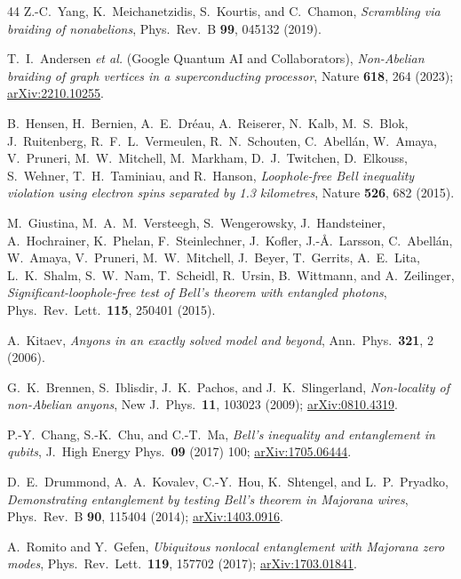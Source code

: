 \documentclass[aps,pra,twocolumn,superscriptaddress,longbibliography,floatfix,nofootinbib]{revtex4-2}
\begin{document}
\begin{thebibliography}{44}
Z.-C.~Yang, K.~Meichanetzidis, S.~Kourtis, and C.~Chamon,
\emph{Scrambling via braiding of nonabelions},
Phys.\ Rev.\ B \textbf{99}, 045132 (2019).

T.~I.~Andersen \emph{et al.} (Google Quantum AI and Collaborators),
\emph{Non-Abelian braiding of graph vertices in a
superconducting processor},
Nature \textbf{618}, 264 (2023);
\href{https://arxiv.org/abs/2210.10255}{arXiv:2210.10255}.


B.~Hensen, H.~Bernien, A.~E.~Dr\'eau, A.~Reiserer, N.~Kalb, M.~S.~Blok,
J.~Ruitenberg, R.~F.~L.~Vermeulen, R.~N.~Schouten, C.~Abell\'an,
W.~Amaya, V.~Pruneri, M.~W.~Mitchell, M.~Markham, D.~J.~Twitchen,
D.~Elkouss, S.~Wehner, T.~H.~Taminiau, and R.~Hanson,
\emph{Loophole-free Bell inequality violation using electron
spins separated by 1.3 kilometres},
Nature \textbf{526}, 682 (2015).

M.~Giustina, M.~A.~M.~Versteegh, S.~Wengerowsky, J.~Handsteiner,
A.~Hochrainer, K.~Phelan, F.~Steinlechner, J.~Kofler,
J.-\AA{}.~Larsson, C.~Abell\'an, W.~Amaya, V.~Pruneri, M.~W.~Mitchell,
J.~Beyer, T.~Gerrits, A.~E.~Lita, L.~K.~Shalm, S.~W.~Nam, T.~Scheidl,
R.~Ursin, B.~Wittmann, and A.~Zeilinger,
\emph{Significant-loophole-free test of Bell's theorem with
entangled photons},
Phys.\ Rev.\ Lett.\ \textbf{115}, 250401 (2015).


A.~Kitaev,
\emph{Anyons in an exactly solved model and beyond},
Ann.\ Phys.\ \textbf{321}, 2 (2006).



G.~K.~Brennen, S.~Iblisdir, J.~K.~Pachos, and J.~K.~Slingerland,
\emph{Non-locality of non-Abelian anyons},
New J.\ Phys.\ \textbf{11}, 103023 (2009);
\href{https://arxiv.org/abs/0810.4319}{arXiv:0810.4319}.

P.-Y.~Chang, S.-K.~Chu, and C.-T.~Ma,
\emph{Bell's inequality and entanglement in qubits},
J.\ High Energy Phys.\ \textbf{09} (2017) 100;
\href{https://arxiv.org/abs/1705.06444}{arXiv:1705.06444}.

D.~E.~Drummond, A.~A.~Kovalev, C.-Y.~Hou, K.~Shtengel, and L.~P.~Pryadko,
\emph{Demonstrating entanglement by testing Bell's theorem in Majorana wires},
Phys.\ Rev.\ B \textbf{90}, 115404 (2014);
\href{https://arxiv.org/abs/1403.0916}{arXiv:1403.0916}.

A.~Romito and Y.~Gefen,
\emph{Ubiquitous nonlocal entanglement with Majorana zero modes},
Phys.\ Rev.\ Lett.\ \textbf{119}, 157702 (2017);
\href{https://arxiv.org/abs/1703.01841}{arXiv:1703.01841}.


\end{thebibliography}
\end{document}
